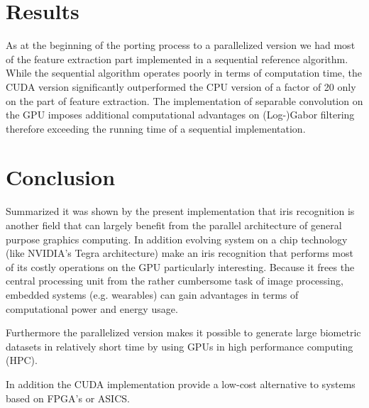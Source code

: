 \documentclass[journal]{IEEEtran}
\begin{document}
\section{Results}
As at the beginning of the porting process to a parallelized version we had most of the feature extraction part implemented in a sequential reference algorithm. While the sequential algorithm operates poorly in terms of computation time, the CUDA version significantly outperformed the CPU version of a factor of 20 only on the part of feature extraction. The implementation of separable convolution on the GPU imposes additional computational advantages on (Log-)Gabor filtering therefore exceeding the running time of a sequential implementation.
\section{Conclusion}
Summarized it was shown by the present implementation that iris recognition is another field that can largely benefit from the parallel architecture of general purpose graphics computing. In addition evolving system on a chip technology (like NVIDIA's Tegra architecture) make an iris recognition that performs most of its costly operations on the GPU particularly interesting. Because it frees the central processing unit from the rather cumbersome task of image processing, embedded systems (e.g. wearables) can gain advantages in terms of computational power and energy usage.
\par Furthermore the parallelized version makes it possible to generate large biometric datasets in relatively short time by using GPUs in high performance computing (HPC).
\par In addition the CUDA implementation provide a low-cost alternative to systems based on FPGA's or ASICS.
\newpage



\
\end{document}
